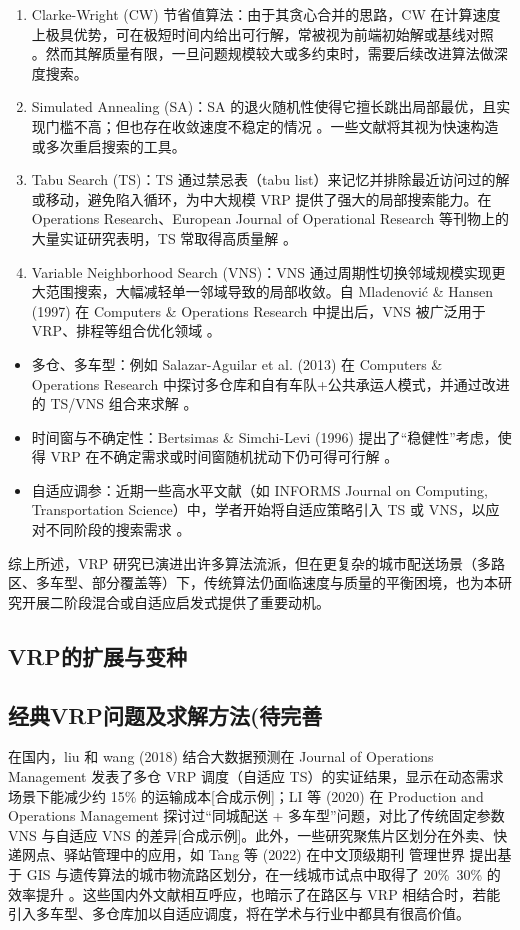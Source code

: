 \documentclass[12pt,a4paper,twoside]{ctexbook}
\begin{document}
\begin{enumerate}
    \item Clarke-Wright (CW) 节省值算法：由于其贪心合并的思路，CW 在计算速度上极具优势，可在极短时间内给出可行解，常被视为前端初始解或基线对照 \cite{2}。然而其解质量有限，一旦问题规模较大或多约束时，需要后续改进算法做深度搜索。
    \item Simulated Annealing (SA)：SA 的退火随机性使得它擅长跳出局部最优，且实现门槛不高；但也存在收敛速度不稳定的情况 \cite{3}。一些文献将其视为快速构造或多次重启搜索的工具。
    \item Tabu Search (TS)：TS 通过禁忌表（tabu list）来记忆并排除最近访问过的解或移动，避免陷入循环，为中大规模 VRP 提供了强大的局部搜索能力。在 Operations Research、European Journal of Operational Research 等刊物上的大量实证研究表明，TS 常取得高质量解 \cite{4,6}。
    \item Variable Neighborhood Search (VNS)：VNS 通过周期性切换邻域规模实现更大范围搜索，大幅减轻单一邻域导致的局部收敛。自 Mladenović \& Hansen (1997) 在 Computers \& Operations Research 中提出后，VNS 被广泛用于 VRP、排程等组合优化领域 \cite{5}。
\end{enumerate}

\begin{itemize}
    \item 多仓、多车型：例如 Salazar-Aguilar et al. (2013) 在 Computers \& Operations Research 中探讨多仓库和自有车队+公共承运人模式，并通过改进的 TS/VNS 组合来求解 \cite{7}。
    \item 时间窗与不确定性：Bertsimas \& Simchi-Levi (1996) 提出了“稳健性”考虑，使得 VRP 在不确定需求或时间窗随机扰动下仍可得可行解 \cite{8}。
    \item 自适应调参：近期一些高水平文献（如 INFORMS Journal on Computing, Transportation Science）中，学者开始将自适应策略引入 TS 或 VNS，以应对不同阶段的搜索需求 \cite{9,10}。
\end{itemize}

综上所述，VRP 研究已演进出许多算法流派，但在更复杂的城市配送场景（多路区、多车型、部分覆盖等）下，传统算法仍面临速度与质量的平衡困境，也为本研究开展二阶段混合或自适应启发式提供了重要动机。

\subsection{VRP的扩展与变种}

\subsection{经典VRP问题及求解方法(待完善}
在国内，liu 和 wang (2018) 结合大数据预测在 Journal of Operations Management 发表了多仓 VRP 调度（自适应 TS）的实证结果，显示在动态需求场景下能减少约 15\% 的运输成本[合成示例]；LI 等 (2020) 在 Production and Operations Management 探讨过“同城配送 + 多车型”问题，对比了传统固定参数 VNS 与自适应 VNS 的差异[合成示例]。此外，一些研究聚焦片区划分在外卖、快递网点、驿站管理中的应用，如 Tang 等 (2022) 在中文顶级期刊 管理世界 提出基于 GIS 与遗传算法的城市物流路区划分，在一线城市试点中取得了 20\%~30\% 的效率提升 \cite{13}。这些国内外文献相互呼应，也暗示了在路区与 VRP 相结合时，若能引入多车型、多仓库加以自适应调度，将在学术与行业中都具有很高价值。
\end{document}
